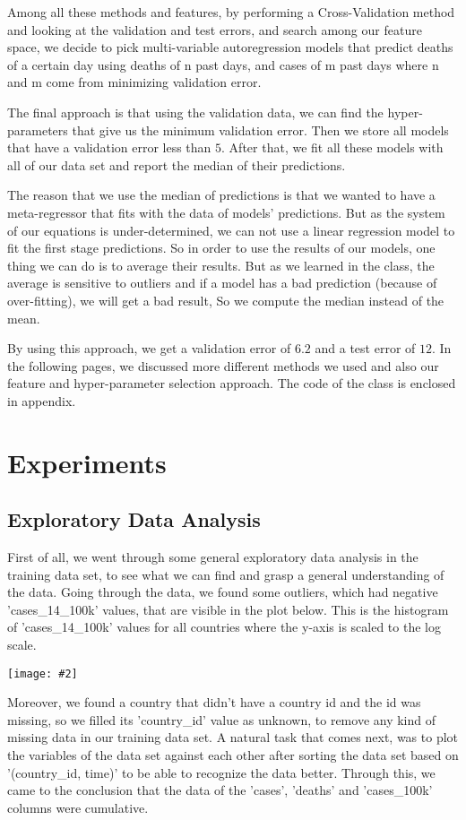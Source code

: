 \documentclass{article}
\newcommand{\centerfig}[2]{\begin{center}\texttt{[image: \#2]}\end{center}}
\begin{document}
Among all these methods and features, by performing a Cross-Validation method and looking at the validation and test errors, and search among our feature space, we decide to pick multi-variable autoregression models that predict deaths of a certain day using deaths of n past days, and cases of {m} past days where n and m come from minimizing validation error. 

The final approach is that using the validation data, we can find the hyper-parameters that give us the minimum validation error. Then we store all models that have a validation error less than $5$. After that, we fit all these models with all of our data set and report the median of their predictions. 

The reason that we use the median of predictions is that we wanted to have a meta-regressor that fits with the data of models’ predictions. But as the system of our equations is under-determined, we can not use a linear regression model to fit the first stage predictions. So in order to use the results of our models, one thing we can do is to average their results. But as we learned in the class, the average is sensitive to outliers and if a model has a bad prediction (because of over-fitting), we will get a bad result, So we compute the median instead of the mean.

By using this approach, we get a validation error of $6.2$ and a test error of $12$. In the following pages, we discussed more different methods we used and also our feature and hyper-parameter selection approach. The code of the class is enclosed in appendix.

\section{Experiments}
\subsection{Exploratory Data Analysis}
First of all, we went through some general exploratory data analysis in the training data set, to see what we can find and grasp a general understanding of the data. Going through the data, we found some outliers, which had negative 'cases\_14\_100k' values, that are visible in the plot below. This is the histogram of 'cases\_14\_100k' values for all countries where the y-axis is scaled to the log scale.

\centerfig{.5}{./Images/1}

Moreover, we found a country that didn’t have a country id and the id was missing, so we filled its 'country\_id' value as unknown, to remove any kind of missing data in our training data set.
A natural task that comes next, was to plot the variables of the data set against each other after sorting the data set based on '(country\_id, time)' to be able to recognize the data better. Through this, we came to the conclusion that the data of the 'cases', 'deaths' and 'cases\_100k' columns were cumulative.
\end{document}
